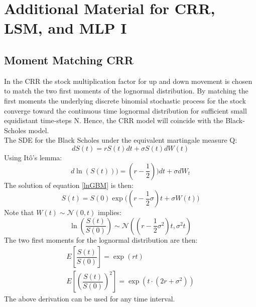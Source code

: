 
\chapter{Additional Material for CRR, LSM, and MLP I} %

\label{AppendixC} %

\section{Moment Matching CRR}\label{CRRMM}
In the CRR the stock multiplication factor for up and down movement is chosen to match the two first moments of the lognormal distribution. By matching the first moments the underlying discrete binomial stochastic process for the stock converge toward the continuous time lognormal distribution for sufficient small equidistant time-steps N. Hence, the CRR model will coincide with the Black-Scholes model.\\

The SDE for the Black Scholes under the equivalent martingale measure Q:
$$dS(t)=rS(t)dt + \sigma S(t) dW(t)$$
Using Itô's lemma:
\begin{equation}\label{lnGBM}
d\ln(S(t)))=(r-\frac{1}{2}))dt + \sigma dW_t
\end{equation}
The solution of equation \ref{lnGBM} is then:
$$S(t)=S(0)\exp\bigg((r-\dfrac{1}{2}\sigma)t+ \sigma W(t) \bigg)$$
Note that $W(t)\sim \mathcal{N}(0,t)$ implies:
$$\ln(\dfrac{S(t)}{S(0)}) \sim \mathcal{N}((r-\dfrac{1}{2}\sigma^2)t, \sigma^2 t)$$
The two first moments for the lognormal distribution are then:
\begin{equation}\label{lnMoments}
\begin{split}
E[\dfrac{S(t)}{S(0)}]=\exp(rt)\\
E[(\dfrac{S(t)}{S(0)})^2]=\exp(t\cdot (2r + \sigma^2))
\end{split}
\end{equation}
The above derivation can be used for any time interval.\\

